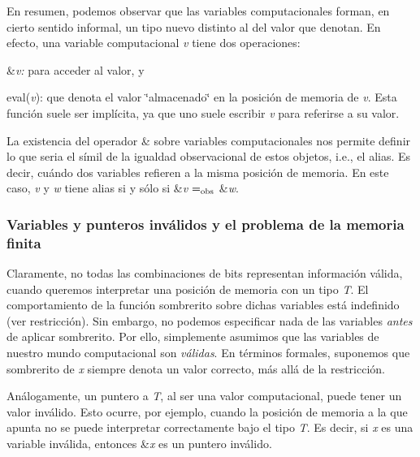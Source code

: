 \-En resumen, podemos observar que las variables computacionales forman, en cierto sentido informal, un tipo nuevo distinto al del valor que denotan. \-En efecto, una variable computacional {\itshape v\/} tiene dos operaciones\-:
\begin{DoxyEnumerate}
\item \&{\itshape v\-:\/} para acceder al valor, y
\item eval({\itshape v\/})\-: que denota el valor \char`\"{}almacenado\char`\"{} en la posición de memoria de {\itshape v\/}. \-Esta función suele ser implícita, ya que uno suele escribir {\itshape v\/} para referirse a su valor.
\end{DoxyEnumerate}

\-La existencia del operador \& sobre variables computacionales nos permite definir lo que seria el símil de la igualdad observacional de estos objetos, i.\-e., el alias. \-Es decir, cuándo dos variables refieren a la misma posición de memoria. \-En este caso, {\itshape v\/} y {\itshape w\/} tiene alias si y sólo si \&{\itshape v\/} $=_{\rm obs}$ \&{\itshape w\/}.\hypertarget{Aliasing_sec-invalido}{}\subsubsection{\-Variables y punteros inválidos y el problema de la memoria finita}\label{Aliasing_sec-invalido}
\-Claramente, no todas las combinaciones de bits representan información válida, cuando queremos interpretar una posición de memoria con un tipo {\itshape \-T\/}. \-El comportamiento de la función sombrerito sobre dichas variables está indefinido (ver restricción). \-Sin embargo, no podemos especificar nada de las variables {\itshape antes\/} de aplicar sombrerito. \-Por ello, simplemente asumimos que las variables de nuestro mundo computacional son {\itshape válidas\/}. \-En términos formales, suponemos que sombrerito de {\itshape x\/} siempre denota un valor correcto, más allá de la restricción.

\-Análogamente, un puntero a {\itshape \-T\/}, al ser una valor computacional, puede tener un valor inválido. \-Esto ocurre, por ejemplo, cuando la posición de memoria a la que apunta no se puede interpretar correctamente bajo el tipo {\itshape \-T\/}. \-Es decir, si {\itshape x\/} es una variable inválida, entonces \&{\itshape x\/} es un puntero inválido.

